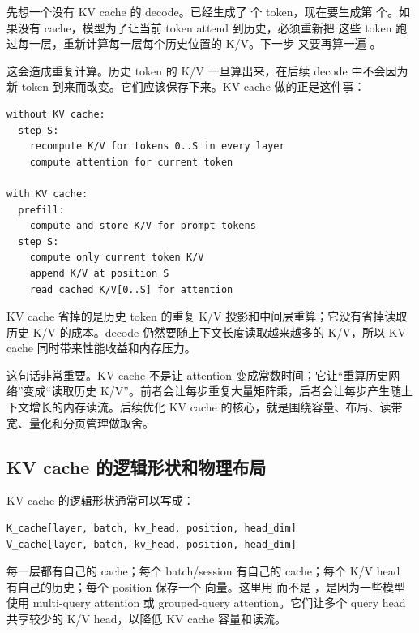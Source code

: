 先想一个没有 KV cache 的 decode。已经生成了  个 token，现在要生成第  个。如果没有 cache，模型为了让当前 token attend 到历史，必须重新把  这些 token 跑过每一层，重新计算每一层每个历史位置的 K/V。下一步  又要再算一遍 。

这会造成重复计算。历史 token 的 K/V 一旦算出来，在后续 decode 中不会因为新 token 到来而改变。它们应该保存下来。KV cache 做的正是这件事：

\begin{lstlisting}[numbers=none,caption={有无 KV cache 的 decode 差异}]
without KV cache:
  step S:
    recompute K/V for tokens 0..S in every layer
    compute attention for current token

with KV cache:
  prefill:
    compute and store K/V for prompt tokens
  step S:
    compute only current token K/V
    append K/V at position S
    read cached K/V[0..S] for attention
\end{lstlisting}

\begin{keyidea}
KV cache 省掉的是历史 token 的重复 K/V 投影和中间层重算；它没有省掉读取历史 K/V 的成本。decode 仍然要随上下文长度读取越来越多的 K/V，所以 KV cache 同时带来性能收益和内存压力。
\end{keyidea}

这句话非常重要。KV cache 不是让 attention 变成常数时间；它让“重算历史网络”变成“读取历史 K/V”。前者会让每步重复大量矩阵乘，后者会让每步产生随上下文增长的内存读流。后续优化 KV cache 的核心，就是围绕容量、布局、读带宽、量化和分页管理做取舍。

\subsection{KV cache 的逻辑形状和物理布局}

KV cache 的逻辑形状通常可以写成：

\begin{lstlisting}[numbers=none,caption={KV cache 的逻辑形状}]
K_cache[layer, batch, kv_head, position, head_dim]
V_cache[layer, batch, kv_head, position, head_dim]
\end{lstlisting}

每一层都有自己的 cache；每个 batch/session 有自己的 cache；每个 K/V head 有自己的历史；每个 position 保存一个  向量。这里用  而不是 ，是因为一些模型使用 multi-query attention 或 grouped-query attention。它们让多个 query head 共享较少的 K/V head，以降低 KV cache 容量和读流。

